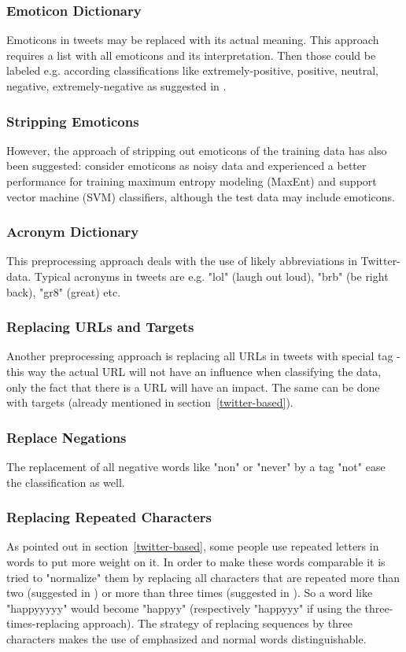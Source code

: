 \documentclass{acm_proc_article-sp}
\begin{document}
\subsubsection{Emoticon Dictionary} Emoticons in tweets may be replaced with
its actual meaning. This approach requires a list with all emoticons and its
interpretation. Then those could be labeled e.g. according classifications like
extremely-positive, positive, neutral, negative, extremely-negative as
suggested in \cite{agarwal2011sentiment}.

\subsubsection{Stripping Emoticons} However, the approach of stripping out
emoticons of the training data has also been suggested: \cite{go2009twitter}
consider emoticons as noisy data and experienced a better performance for
training maximum entropy modeling (MaxEnt) and support vector machine (SVM)
classifiers, although the test data may include emoticons.

\subsubsection{Acronym Dictionary} This preprocessing approach deals with the
use of likely abbreviations in Twitter-data.  Typical acronyms in tweets are
e.g. "lol" (laugh out loud), "brb" (be right back), "gr8" (great) etc.

\subsubsection{Replacing URLs and Targets} Another preprocessing approach is
replacing all URLs in tweets with special tag - this way the actual URL will
not have an influence when classifying the data, only the fact that there is a
URL will have an impact.  The same can be done with targets (already mentioned
in section~\ref{twitter-based}).

\subsubsection{Replace Negations} The replacement of all negative words like
"non" or "never" by a tag "not" ease the classification as well.

\subsubsection{Replacing Repeated Characters} As pointed out in
section~\ref{twitter-based}, some people use repeated letters in words to put
more weight on it. In order to make these words comparable it is tried to
"normalize" them by replacing all characters that are repeated more than two
(suggested in \cite{go2009twitter}) or more than three times (suggested in
\cite{agarwal2011sentiment}). So a word like "happyyyyy" would become "happyy"
(respectively "happyyy" if using the three-times-replacing approach). The
strategy of replacing sequences by three characters makes the use of emphasized
and normal words distinguishable.
\end{document}
